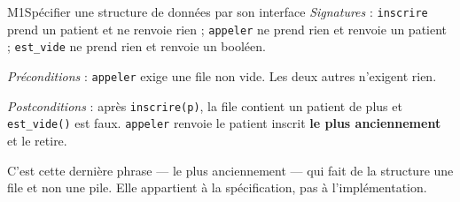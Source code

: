 \begin{fichemethode}{M1}{Spécifier une structure de données par son interface}
\emph{Signatures} : \lstinline{inscrire} prend un patient et ne renvoie rien ;
\lstinline{appeler} ne prend rien et renvoie un patient ; \lstinline{est_vide} ne prend rien
et renvoie un booléen.

\emph{Préconditions} : \lstinline{appeler} exige une file non vide. Les deux autres n'exigent
rien.

\emph{Postconditions} : après \lstinline{inscrire(p)}, la file contient un patient de plus et
\lstinline{est_vide()} est faux. \lstinline{appeler} renvoie le patient inscrit \textbf{le
plus anciennement} et le retire.

C'est cette dernière phrase — le plus anciennement — qui fait de la structure une file et non
une pile. Elle appartient à la spécification, pas à l'implémentation.

%
%
%

\end{fichemethode}
